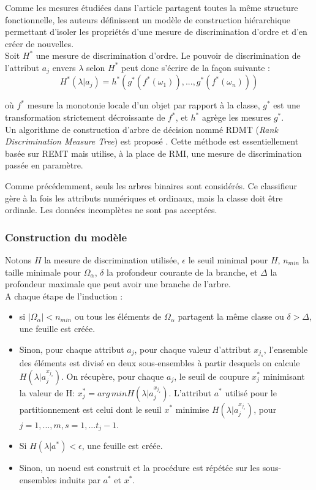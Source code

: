 \documentclass[a4paper]{article}
\begin{document}
Comme les mesures étudiées dans l'article partagent toutes la même structure
fonctionnelle, les auteurs définissent un modèle de construction hiérarchique
permettant d'isoler les propriétés d'une mesure de discrimination d'ordre et
d'en créer de nouvelles. \\
Soit $H^*$ une mesure de discrimination d'ordre. Le pouvoir de discrimination de
l'attribut $a_j$ envers $\lambda$ selon $H^*$ peut donc s'écrire de la façon suivante :
$$ H^*(\lambda | a_j) = h^*(g^*(f^*(\omega_1)),...,g^*(f^*(\omega_n)))$$

où $f^*$ mesure la monotonie locale d'un objet par rapport à la classe, $g^*$
est une transformation strictement décroissante de $f^*$, et $h^*$ agrège les
mesures $g^*$. \\

Un algorithme de construction d'arbre de décision nommé RDMT (\emph{Rank
Discrimination Measure Tree}) est proposé \cite{hu-rank}. Cette méthode est
essentiellement basée sur REMT mais utilise, à la place de RMI, une mesure de
discrimination passée en paramètre.

\noindent Comme précédemment, seuls les arbres binaires sont considérés. Ce
classifieur gère à la fois les attributs numériques et ordinaux, mais la classe
doit être ordinale. Les données incomplètes ne sont pas acceptées.\\

\subsubsection{Construction du modèle}

Notons $H$ la mesure de discrimination utilisée, $\epsilon$ le seuil minimal pour
$H$, $n_{min}$ la taille minimale pour $\Omega_{\alpha}$, $\delta$ la
profondeur courante de la branche, et $\Delta$ la profondeur maximale que peut
avoir une branche de l'arbre. \\

\noindent A chaque étape de l'induction :
\begin{itemize}
    \item si $|\Omega_{\alpha}| < n_{min}$ ou tous les éléments
de $\Omega_{\alpha}$ partagent la même classe ou $\delta > \Delta$, une feuille est créée. 
    \item Sinon, pour chaque attribut $a_j$, pour chaque valeur d'attribut $x_{j_s}$, l'ensemble
des éléments est divisé en deux sous-ensembles à partir desquels on calcule
        $H(\lambda|a^{x_{j_s}}_j)$. On récupère, pour chaque $a_j$,
le seuil de coupure $x^*_j$ minimisant la valeur de H:
$x^*_{j} = arg\,min H(\lambda|a^{x_{j_s}}_j)$. L'attribut $a^*$ utilisé pour le
partitionnement est celui dont le seuil $x^*$ minimise
$H(\lambda|a^{x_{j_s}}_j)$, pour $j=1,...,m, s=1,...t_j-1.$ 
    \item Si $H(\lambda|a^*) < \epsilon$, une feuille est créée. 
    \item Sinon, un noeud est construit et la
procédure est répétée sur les sous-ensembles induits par $a^*$ et $x^*$. \\
\end{itemize}
\end{document}
